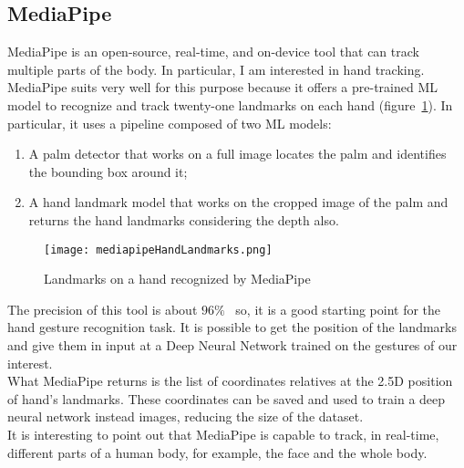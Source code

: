 \documentclass[../thesis.tex]{subfiles}
\begin{document}
\subsection{MediaPipe}\label{sec:mediapipe}
MediaPipe is an open-source, real-time, and on-device tool that can track multiple parts of the body. In particular, I am interested in hand tracking. MediaPipe suits very well for this purpose because it offers a pre-trained \acrshort{ML} model to recognize and track twenty-one landmarks on each hand (figure~\ref{fig:landmarksMediapipe}). In particular, it uses a pipeline composed of two \acrshort{ML} models:
\begin{enumerate}
    \item A palm detector that works on a full image locates the palm and identifies the bounding box around it;
    \item A hand landmark model that works on the cropped image of the palm and returns the hand landmarks considering the depth also. 
\end{enumerate}
\begin{figure}[H]
    \centering
    \texttt{[image: mediapipeHandLandmarks.png]}
    \caption{Landmarks on a hand recognized by MediaPipe~\cite{site:mediapipe}}
    \label{fig:landmarksMediapipe}
\end{figure}
The precision of this tool is about $96\%$~\cite{paper:mediapipe} so, it is a good starting point for the hand gesture recognition task. It is possible to get the position of the landmarks and give them in input at a Deep Neural Network trained on the gestures of our interest.\\
What MediaPipe returns is the list of coordinates relatives at the 2.5D position of hand's landmarks. These coordinates can be saved and used to train a deep neural network instead images, reducing the size of the dataset.\\
It is interesting to point out that MediaPipe is capable to track, in real-time, different parts of a human body, for example, the face and the whole body.~\cite{site:mediapipe}
\end{document}
